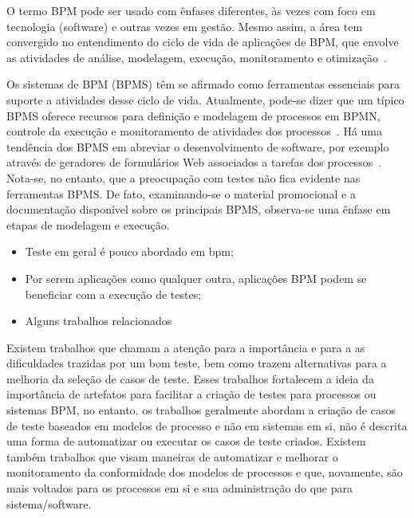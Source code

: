 \documentclass[12pt]{article}
\begin{document}
O termo BPM pode ser usado com ênfases diferentes, às vezes com foco em tecnologia (software) e outras vezes em gestão. Mesmo assim, a área tem convergido no entendimento do ciclo de vida de aplicações de BPM, que envolve as atividades de análise, modelagem, execução, monitoramento e otimização~\cite{ABPMP}. 

Os sistemas de BPM (BPMS) têm se afirmado como ferramentas essenciais para suporte a atividades desse ciclo de vida. Atualmente, pode-se dizer que um típico BPMS oferece recursos para definição e modelagem de processos em BPMN, controle da execução e monitoramento de atividades dos processos~\cite{forrester}. Há uma tendência dos BPMS em abreviar o desenvolvimento de software, por exemplo através de geradores de formulários Web associados a tarefas dos processos~\cite{greenresearch}. Nota-se, no entanto, que a preocupação com testes não fica evidente nas ferramentas BPMS. De fato, examinando-se o material promocional e a documentação disponível sobre os principais BPMS, observa-se uma ênfase em etapas de modelagem e execução.

\begin{itemize}
\item Teste em geral é pouco abordado em bpm;
\item Por serem aplicações como qualquer outra, aplicações BPM podem se beneficiar com a execução de testes;
\item Alguns trabalhos relacionados
\end{itemize}



Existem trabalhos que chamam a atenção para a importância e para a as dificuldades trazidas por um bom teste, bem como trazem alternativas para a melhoria da seleção de casos de teste\cite{bohmer2015genetic}. Esses trabalhos fortalecem a ideia da importância de artefatos para facilitar a criação de testes para processos ou sistemas BPM, no entanto, os trabalhos geralmente abordam a criação de casos de teste baseados em modelos de processo e não em sistemas em si, não é descrita uma forma de automatizar ou executar os casos de teste criados. Existem também trabalhos que visam maneiras de automatizar e melhorar o monitoramento da conformidade dos modelos de processos \cite{ly2015compliance,van2012replaying} e que, novamente, são mais voltados para os processos em si e sua administração do que para sistema/software.
\end{document}
